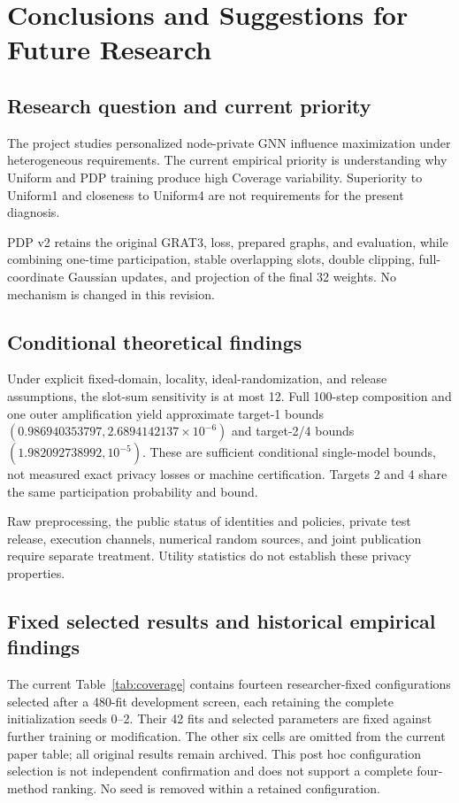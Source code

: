 \chapter{Conclusions and Suggestions for Future Research}\label{ch:conclusion}
\section{Research question and current priority}
The project studies personalized node-private GNN influence maximization under heterogeneous requirements. The current empirical priority is understanding why Uniform and PDP training produce high Coverage variability. Superiority to Uniform1 and closeness to Uniform4 are not requirements for the present diagnosis.

PDP v2 retains the original GRAT3, loss, prepared graphs, and evaluation, while combining one-time participation, stable overlapping slots, double clipping, full-coordinate Gaussian updates, and projection of the final 32 weights. No mechanism is changed in this revision.

\section{Conditional theoretical findings}
Under explicit fixed-domain, locality, ideal-randomization, and release assumptions, the slot-sum sensitivity is at most 12. Full 100-step composition and one outer amplification yield approximate target-1 bounds $(0.986940353797,2.6894142137\times10^{-6})$ and target-2/4 bounds $(1.982092738992,10^{-5})$. These are sufficient conditional single-model bounds, not measured exact privacy losses or machine certification. Targets 2 and 4 share the same participation probability and bound.

Raw preprocessing, the public status of identities and policies, private test release, execution channels, numerical random sources, and joint publication require separate treatment. Utility statistics do not establish these privacy properties.

\section{Fixed selected results and historical empirical findings}
The current Table~\ref{tab:coverage} contains fourteen researcher-fixed configurations selected after a 480-fit development screen, each retaining the complete initialization seeds 0--2. Their 42 fits and selected parameters are fixed against further training or modification. The other six cells are omitted from the current paper table; all original results remain archived. This post hoc configuration selection is not independent confirmation and does not support a complete four-method ranking. No seed is removed within a retained configuration.

